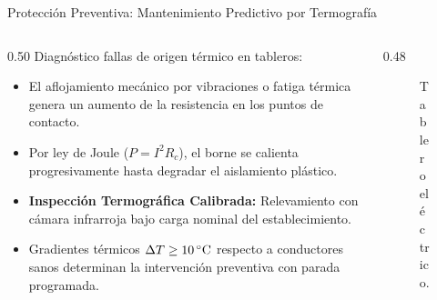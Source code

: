 \begin{frame}{Protección Preventiva: Mantenimiento Predictivo por Termografía}
  \begin{columns}[c]
    \begin{column}{0.50\textwidth}
      \small
      Diagnóstico fallas de origen térmico en tableros:
      \begin{itemize}
        \scriptsize
        \item El aflojamiento mecánico por vibraciones o fatiga térmica genera un aumento de la resistencia en los puntos de contacto.
        \item Por ley de Joule ($P = I^2 R_c$), el borne se calienta progresivamente hasta degradar el aislamiento plástico.
        \item \textbf{Inspección Termográfica Calibrada:} Relevamiento con cámara infrarroja bajo carga nominal del establecimiento.
        \item Gradientes térmicos $\Delta T \ge 10\,^\circ\mathrm{C}$ respecto a conductores sanos determinan la intervención preventiva con parada programada.
      \end{itemize}
    \end{column}

    \begin{column}{0.48\textwidth}
      \centering
      \begin{figure}
        \centering
        \caption{Tablero eléctrico.}
      \end{figure}
    \end{column}
  \end{columns}
\end{frame}

